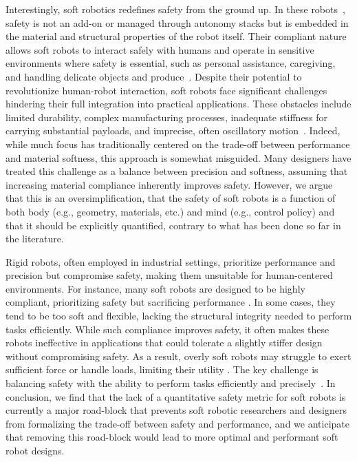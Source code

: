 Interestingly, soft robotics redefines safety from the ground up. 
In these robots~\cite{rus2015design, laschi2016soft}, safety is not an add-on or managed through autonomy stacks but is embedded in the material and structural properties of the robot itself. 
Their compliant nature allows soft robots to interact safely with humans and operate in sensitive environments where safety is essential, such as personal assistance, caregiving, and handling delicate objects and produce~\cite{abidi2017intrinsic}. 
Despite their potential to revolutionize human-robot interaction, soft robots face significant challenges hindering their full integration into practical applications. These obstacles include limited durability, complex manufacturing processes, inadequate stiffness for carrying substantial payloads, and imprecise, often oscillatory motion~\cite{mazzolai2022roadmap, majidi2014soft, hawkes2017soft}. 
Indeed, while much focus has traditionally centered on the trade-off between performance and material softness, this approach is somewhat misguided. 
Many designers have treated this challenge as a balance between precision and softness, assuming that increasing material compliance inherently improves safety.
However, we argue that this is an oversimplification, that the safety of soft robots is a function of both body (e.g., geometry, materials, etc.) and mind (e.g., control policy) and that it should be explicitly quantified, contrary to what has been done so far in the literature.

Rigid robots, often employed in industrial settings, prioritize performance and precision but compromise safety, making them unsuitable for human-centered environments.
For instance, many soft robots are designed to be highly compliant, prioritizing safety but sacrificing performance \cite{cianchetti2013stiff}. 
In some cases, they tend to be too soft and flexible, lacking the structural integrity needed to perform tasks efficiently. 
While such compliance improves safety, it often makes these robots ineffective in applications that could tolerate a slightly stiffer design without compromising safety. 
As a result, overly soft robots may struggle to exert sufficient force or handle loads, limiting their utility \cite{iida2011soft}.
The key challenge is balancing safety with the ability to perform tasks efficiently and precisely~\cite{khanna2022human}.
In conclusion, we find that the lack of a quantitative safety metric for soft robots is currently a major road-block that prevents soft robotic researchers and designers from formalizing the trade-off between safety and performance, and we anticipate that removing this road-block would lead to more optimal and performant soft robot designs.

